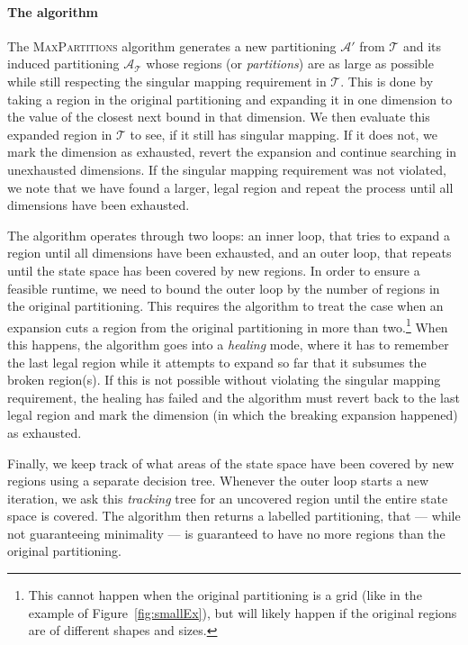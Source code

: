 \documentclass{easychair}
\begin{document}
\paragraph{The algorithm} The \textsc{MaxPartitions} algorithm generates a new
partitioning $\mathcal{A}'$ from $\mathcal{T}$ and its induced partitioning
$\mathcal{A}_{\mathcal{T}}$ whose regions (or \textit{partitions}) are as large
as possible while still respecting the singular mapping requirement in
$\mathcal{T}$. This is done by taking a region in the original partitioning and
expanding it in one dimension to the value of the closest next bound in that
dimension. We then evaluate this expanded region in $\mathcal{T}$ to see, if it
still has singular mapping. If it does not, we mark the dimension as exhausted,
revert the expansion and continue searching in unexhausted dimensions. If the
singular mapping requirement was not violated, we note that we have found a
larger, legal region and repeat the process until all dimensions have been
exhausted.

The algorithm operates through two loops: an inner loop, that tries to expand a
region until all dimensions have been exhausted, and an outer loop, that repeats
until the state space has been covered by new regions. In order to ensure a
feasible runtime, we need to bound the outer loop by the number of regions in
the original partitioning. This requires the algorithm to treat the case when an
expansion cuts a region from the original partitioning in more than
two.\footnote{%
    This cannot happen when the original partitioning is a grid (like in the
    example of Figure~\ref{fig:smallEx}), but will likely happen if the original
    regions are of different shapes and sizes.
} When this happens, the algorithm goes into a \textit{healing} mode, where it
has to remember the last legal region while it attempts to expand so far that it
subsumes the broken region(s). If this is not possible without violating the
singular mapping requirement, the healing has failed and the algorithm must
revert back to the last legal region and mark the dimension (in which the
breaking expansion happened) as exhausted.

Finally, we keep track of what areas of the state space have been covered by new
regions using a separate decision tree. Whenever the outer loop starts a new
iteration, we ask this \textit{tracking} tree for an uncovered region until the
entire state space is covered. The algorithm then returns a labelled
partitioning, that --- while not guaranteeing minimality --- is guaranteed to
have no more regions than the original partitioning.
\end{document}
